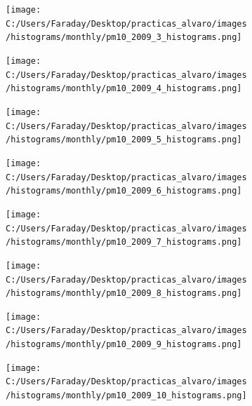 \documentclass[12pt]{article}
\begin{document}
\begin{figure}[H]
\centering
\begin{subfigure}[h]{0.45\textwidth}
\texttt{[image: C:/Users/Faraday/Desktop/practicas\_alvaro/images/histograms/monthly/pm10\_2009\_3\_histograms.png]}
\caption{}
\label{fig:hist-mon-3-3-2009}
\end{subfigure}
%
\begin{subfigure}[H]{0.45\textwidth}
\texttt{[image: C:/Users/Faraday/Desktop/practicas\_alvaro/images/histograms/monthly/pm10\_2009\_4\_histograms.png]}
\caption{}
\label{fig:hist-mon-3-4-2009}
\end{subfigure}
\caption{}
\end{figure}

\begin{figure}[H]
\centering
\begin{subfigure}[h]{0.45\textwidth}
\texttt{[image: C:/Users/Faraday/Desktop/practicas\_alvaro/images/histograms/monthly/pm10\_2009\_5\_histograms.png]}
\caption{}
\label{fig:hist-mon-3-5-2009}
\end{subfigure}
%
\begin{subfigure}[H]{0.45\textwidth}
\texttt{[image: C:/Users/Faraday/Desktop/practicas\_alvaro/images/histograms/monthly/pm10\_2009\_6\_histograms.png]}
\caption{}
\label{fig:hist-mon-3-6-2009}
\end{subfigure}
\caption{}
\end{figure}

\newpage

\begin{figure}[H]
\centering
\begin{subfigure}[h]{0.45\textwidth}
\texttt{[image: C:/Users/Faraday/Desktop/practicas\_alvaro/images/histograms/monthly/pm10\_2009\_7\_histograms.png]}
\caption{}
\label{fig:hist-mon-3-7-2009}
\end{subfigure}
%
\begin{subfigure}[H]{0.45\textwidth}
\texttt{[image: C:/Users/Faraday/Desktop/practicas\_alvaro/images/histograms/monthly/pm10\_2009\_8\_histograms.png]}
\caption{}
\label{fig:hist-mon-3-8-2009}
\end{subfigure}
\caption{}
\end{figure}

\begin{figure}[H]
\centering
\begin{subfigure}[h]{0.45\textwidth}
\texttt{[image: C:/Users/Faraday/Desktop/practicas\_alvaro/images/histograms/monthly/pm10\_2009\_9\_histograms.png]}
\caption{}
\label{fig:hist-mon-3-9-2009}
\end{subfigure}
%
\begin{subfigure}[H]{0.45\textwidth}
\texttt{[image: C:/Users/Faraday/Desktop/practicas\_alvaro/images/histograms/monthly/pm10\_2009\_10\_histograms.png]}
\caption{}
\label{fig:hist-mon-3-10-2009}
\end{subfigure}
\caption{}
\end{figure}
\end{document}
